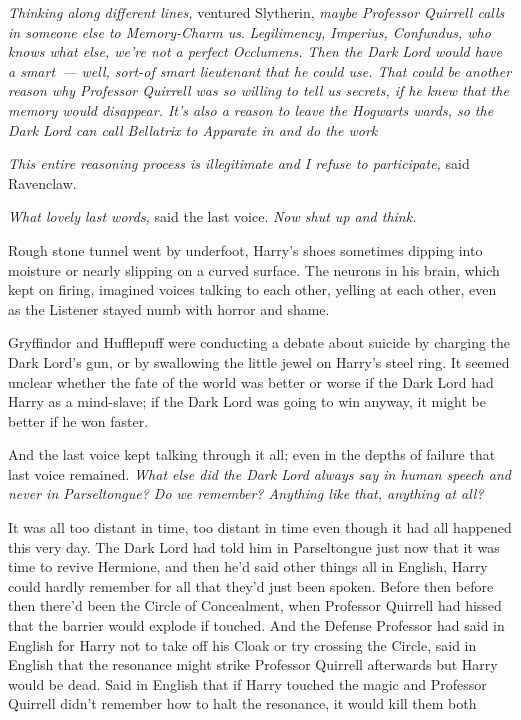 \emph{Thinking along different lines,} ventured Slytherin, \emph{maybe
Professor Quirrell calls in someone else to Memory-Charm us}.
\emph{Legilimency, Imperius, Confundus, who knows what else, we're not a
perfect Occlumens. Then the Dark Lord would have a smart~--- well, sort-of smart
lieutenant that he could use. That could be another reason why Professor
Quirrell was so willing to tell us secrets, if he knew that the memory would
disappear. It's also a reason to leave the Hogwarts wards, so the Dark Lord can
call Bellatrix to Apparate in and do the work{\el}}

\emph{This entire reasoning process is illegitimate and I refuse to
participate,} said Ravenclaw.

\emph{What lovely last words,} said the last voice. \emph{Now shut up and
think.}

Rough stone tunnel went by underfoot, Harry's shoes sometimes dipping into
moisture or nearly slipping on a curved surface. The neurons in his brain,
which kept on firing, imagined voices talking to each other, yelling at each
other, even as the Listener stayed numb with horror and shame.

Gryffindor and Hufflepuff were conducting a debate about suicide by charging
the Dark Lord's gun, or by swallowing the little jewel on Harry's steel ring.
It seemed unclear whether the fate of the world was better or worse if the Dark
Lord had Harry as a mind-slave; if the Dark Lord was going to win anyway, it
might be better if he won faster.

And the last voice kept talking through it all; even in the depths of failure
that last voice remained. \emph{What else did the Dark Lord always say in human
speech and never in Parseltongue? Do we remember? Anything like that, anything
at all?}

It was all too distant in time, too distant in time even though it had all
happened this very day. The Dark Lord had told him in Parseltongue just now
that it was time to revive Hermione, and then he'd said other things all in
English, Harry could hardly remember for all that they'd just been spoken.
Before then{\el} before then there'd been the Circle of Concealment, when
Professor Quirrell had hissed that the barrier would explode if touched. And
the Defense Professor had said in English for Harry not to take off his Cloak
or try crossing the Circle, said in English that the resonance might strike
Professor Quirrell afterwards but Harry would be dead. Said in English that if
Harry touched the magic and Professor Quirrell didn't remember how to halt the
resonance, it would kill them both{\el}

